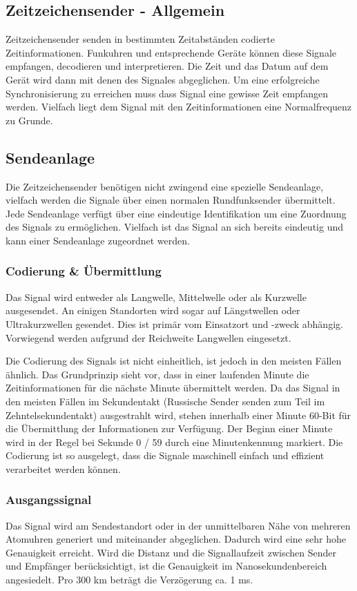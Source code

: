 \subsection{Zeitzeichensender - Allgemein}

Zeitzeichensender senden in bestimmten Zeitabständen codierte Zeitinformationen. Funkuhren und entsprechende Geräte können diese Signale empfangen, decodieren und interpretieren. Die Zeit und das Datum auf dem Gerät wird dann mit denen des Signales abgeglichen. Um eine erfolgreiche Synchronisierung zu erreichen muss dass Signal eine gewisse Zeit empfangen werden. Vielfach liegt dem Signal mit den Zeitinformationen eine Normalfrequenz zu Grunde.

\subsection{Sendeanlage}
Die Zeitzeichensender benötigen nicht zwingend eine spezielle Sendeanlage, vielfach werden die Signale über einen normalen Rundfunksender übermittelt. Jede Sendeanlage verfügt über eine eindeutige Identifikation um eine Zuordnung des Signals zu ermöglichen. Vielfach ist das Signal an sich bereits eindeutig und kann einer Sendeanlage zugeordnet werden.

\subsubsection{Codierung \& Übermittlung}
Das Signal wird entweder als Langwelle, Mittelwelle oder als Kurzwelle ausgesendet. An einigen Standorten wird sogar auf Längstwellen oder Ultrakurzwellen gesendet. Dies ist primär vom Einsatzort und -zweck abhängig. Vorwiegend werden aufgrund der Reichweite Langwellen eingesetzt.

Die Codierung des Signals ist nicht einheitlich, ist jedoch in den meisten Fällen ähnlich. Das Grundprinzip sieht vor, dass in einer laufenden Minute die Zeitinformationen für die nächste Minute übermittelt werden. Da das Signal in den meisten Fällen im Sekundentakt (Russische Sender senden zum Teil im Zehntelsekundentakt) ausgestrahlt wird, stehen innerhalb einer Minute 60-Bit für die Übermittlung der Informationen zur Verfügung. Der Beginn einer Minute wird in der Regel bei Sekunde 0 / 59 durch eine Minutenkennung markiert. Die Codierung ist so ausgelegt, dass die Signale maschinell einfach und effizient verarbeitet werden können.

\subsubsection{Ausgangssignal}
Das Signal wird am Sendestandort oder in der unmittelbaren Nähe von mehreren Atomuhren generiert und miteinander abgeglichen. Dadurch wird eine sehr hohe Genauigkeit erreicht. Wird die Distanz und die Signallaufzeit zwischen Sender und Empfänger berücksichtigt, ist die Genauigkeit im Nanosekundenbereich angesiedelt. Pro 300 km beträgt die Verzögerung ca. 1 ms.


